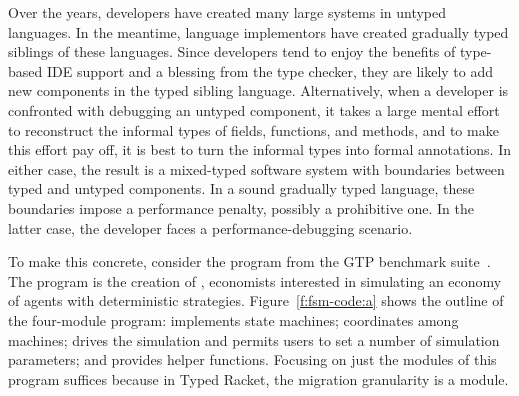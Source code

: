 
Over the years, developers have created many large systems in untyped languages.
In the meantime, language implementors have created gradually typed siblings of
these languages.  Since developers tend to enjoy the benefits of type-based IDE
support and a blessing from the type checker, they are likely to add new
components in the typed sibling language. Alternatively, when a developer is
confronted with debugging an untyped component, it takes a large mental effort
to reconstruct the informal types of fields, functions, and methods, and to make
this effort pay off, it is best to turn the informal types into formal
annotations. In either case, the result is a mixed-typed software system with
boundaries between typed and untyped components. In a sound gradually typed
language, these boundaries impose a performance penalty, possibly a prohibitive
one. In the latter case, the developer faces a performance-debugging scenario.


To make this concrete, consider the  program from the GTP benchmark
suite~\cite{gtp-benchmarks}. The program is the creation of \citet{fsm},
economists interested in simulating an economy of agents with deterministic
strategies. Figure~\ref{f:fsm-code:a} shows the outline of the four-module
program:  implements state machines;  coordinates among
machines;  drives the simulation and permits users to set a number of
simulation parameters; and  provides helper functions.  Focusing on
just the modules of this program suffices because in Typed Racket, the migration
granularity is a module.

